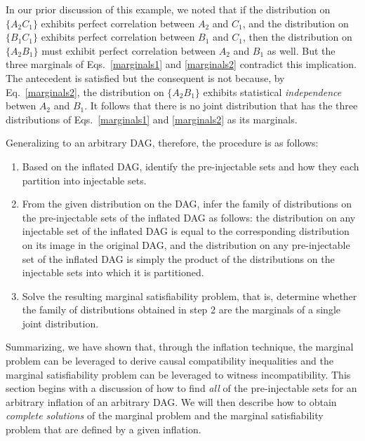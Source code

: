 \documentclass[aps,english,superscriptaddress,onecolumn,twoside,longbibliography,pra,floatfix,fleqn,nofootinbib]{revtex4-1}%
\theoremstyle{definition}
\begin{document}
In our prior discussion of this example, we noted that if the distribution on $\{ A_2 C_1\}$ exhibits perfect correlation between $A_2$ and $C_1$, and the distribution on $\{ B_1 C_1\}$ exhibits perfect correlation between $B_1$ and $C_1$, then the distribution on $\{ A_2 B_1\}$ must exhibit perfect correlation between $A_2$ and $B_1$ as well.  
But the three marginals of Eqs.~\eqref{marginals1} and \eqref{marginals2} contradict this implication.  The antecedent is satisfied but the consequent is not because, by Eq.~\eqref{marginals2}, the distribution on $\{ A_2 B_1\}$ exhibits statistical {\em independence} betwen $A_2$ and $B_1$.  It follows that there is no joint distribution that has the three distributions of Eqs.~\eqref{marginals1} and \eqref{marginals2} as its marginals. 

Generalizing to an arbitrary DAG, therefore, the procedure is as follows:
\begin{enumerate}
\item Based on the inflated DAG, identify the pre-injectable sets and how they each partition into injectable sets.
\item From the given distribution on the DAG, infer the family of distributions on the pre-injectable sets of the inflated DAG as follows: the distribution on any injectable set of the inflated DAG is equal to the corresponding distribution on its image in the original DAG, and the distribution on any pre-injectable set of the inflated DAG is simply the product of the distributions on the injectable sets into which it is partitioned.
\item Solve the resulting marginal satisfiability problem, that is, determine whether the family of distributions obtained in step 2 are the marginals of a single joint distribution.
\end{enumerate}



Summarizing, we have shown that, through the inflation technique, the marginal problem can be leveraged to derive causal compatibility inequalities and the marginal satisfiability problem can be leveraged to witness incompatibility.  This section begins with a discussion of how to find {\em all} of the pre-injectable sets for an arbitrary inflation of an arbitrary DAG.  We will then describe how to obtain {\em complete solutions} of the marginal problem and the marginal satisfiability problem that are defined by a given inflation. 
\end{document}
